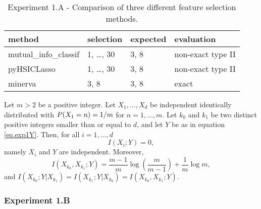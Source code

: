 \begin{table}
	\centering
{
	\begin{tabular}{l|l|l|l}
		\textbf{method}
		&
		\textbf{selection}
		&
		\textbf{expected}
		&
		\textbf{evaluation}
		\\
		\hline
		mutual\_info\_classif
		&
		1, \dots, 30
		& 
		3, 8
		&
		non-exact type II
		\\
		pyHSICLasso
		&
		1, \dots, 30
		& 
		3, 8
		&
		non-exact type II
		\\
		minerva
		& 
		3, 8
		&
		3, 8
		&
		exact
	\end{tabular}
}
\caption{Experiment 1.A - Comparison of three different feature selection methods.}
\label{tab.experiment1A}
\end{table}






\begin{lemma}
	\label{lemma.experiment1}
	Let $m>2$ be a positive integer. 
	Let
	$X_1, \dots, X_d$
	be independent identically distributed
	with 
	${{P}}(X_1 = n) = 1 / m$
	for $n=1, \dots, m$. 
	Let 
	$k_0$ and $k_1$ 
	be two distinct positive integers 
	smaller than or equal to $d$,
	and let $Y$
	be as in equation \eqref{eq.exp1Y}.
	Then,
	for all $i=1, \dots, d$
	\begin{equation}
		\label{eq.exp1pairwisemi}
		I(X_i; Y) = 0,
	\end{equation}
	namely $X_i$ and $Y$ are independent. 
	Moreover,
	\begin{equation}
		\label{eq.exp1mi}
		I(X_{k_0}, X_{k_1}; Y) 
		=
			\frac{m-1}{m} \log\left(\frac{m}{m-1}\right)
			+
			\frac{1}{m}\log m
			,
	\end{equation}
	and $I(X_{k_0}; Y \lvert X_{k_1}) = I(X_{k_1}; Y \lvert X_{k_0})  = I(X_{k_0}, X_{k_1} ; Y)$.
\end{lemma}




\subsubsection{Experiment 1.B}

